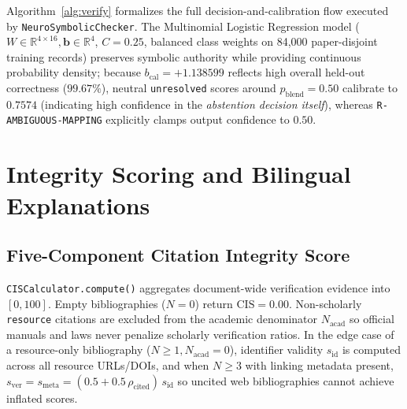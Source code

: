 Algorithm~\ref{alg:verify} formalizes the full decision-and-calibration flow executed by \texttt{NeuroSymbolicChecker}. The Multinomial Logistic Regression model ($W \in \mathbb{R}^{4 \times 16}, \mathbf{b} \in \mathbb{R}^4$, $C = 0.25$, balanced class weights on 84,000 paper-disjoint training records) preserves symbolic authority while providing continuous probability density; because $b_{\text{cal}} = +1.138599$ reflects high overall held-out correctness ($99.67\%$), neutral \texttt{unresolved} scores around $p_{\text{blend}} = 0.50$ calibrate to $0.7574$ (indicating high confidence in the \emph{abstention decision itself}), whereas \texttt{R-AMBIGUOUS-MAPPING} explicitly clamps output confidence to $0.50$.

\section{Integrity Scoring and Bilingual Explanations}

\subsection{Five-Component Citation Integrity Score}

\texttt{CISCalculator.compute()} aggregates document-wide verification evidence into $[0, 100]$. Empty bibliographies ($N = 0$) return $\text{CIS} = 0.00$. Non-scholarly \texttt{resource} citations are excluded from the academic denominator $N_{\text{acad}}$ so official manuals and laws never penalize scholarly verification ratios. In the edge case of a resource-only bibliography ($N \ge 1, N_{\text{acad}} = 0$), identifier validity $s_{\text{id}}$ is computed across all resource URLs/DOIs, and when $N \ge 3$ with linking metadata present, $s_{\text{ver}} = s_{\text{meta}} = (0.5 + 0.5\,\rho_{\text{cited}})\,s_{\text{id}}$ so uncited web bibliographies cannot achieve inflated scores.

